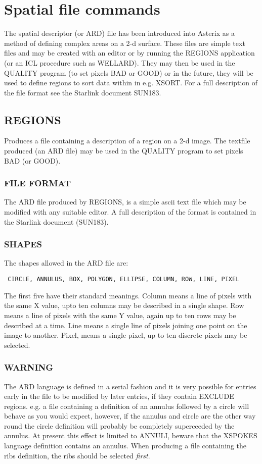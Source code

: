 \documentclass{book}
\renewcommand{\_}{{\tt\char'137}}     %
\begin{document}
\chapter{Spatial file commands}
The spatial descriptor (or ARD) file has been introduced into Asterix
as a method of defining complex areas on a 2-d surface. These files
are simple text files and may be created with an editor or by running
the REGIONS application (or an ICL procedure such as WELLARD). They
may then be used in the QUALITY program (to set pixels BAD or GOOD) or
in the future, they will be used to define regions to sort data within
in e.g. XSORT. For a full description of the file format see the Starlink
document SUN183.
 
\section{REGIONS}
Produces a file containing a description of a region on a 2-d image.
The textfile produced (an ARD file) may be used in the QUALITY program
to set pixels BAD (or GOOD).
 
\subsection{FILE FORMAT}
The ARD file produced by REGIONS, is a simple ascii text file which
may be modified with any suitable editor. A full description of the
format is contained in the Starlink document (SUN183).
 
\subsection{SHAPES}
The shapes allowed in the ARD file are:
 
\begin{verbatim}
 CIRCLE, ANNULUS, BOX, POLYGON, ELLIPSE, COLUMN, ROW, LINE, PIXEL
\end{verbatim}
The first five have their standard meanings. Column means a line of pixels
with the same X value, upto ten columns may be described in a single
shape. Row means a line of pixels with the same Y value, again up to
ten rows may be described at a time. Line means a single line of pixels
joining one point on the image to another. Pixel, means a single pixel,
up to ten discrete pixels may be selected.
 
\subsection{WARNING}
The ARD language is defined in a serial fashion and it is very possible
for entries early in the file to be modified by later entries, if they
contain EXCLUDE regions. e.g. a file containing a definition of an
annulus followed by a circle will behave as you would expect, however, if the
annulus and circle are the other way round the circle definition will
probably be completely superceeded by the annulus. At present this
effect is limited to ANNULI, beware that the XSPOKES language definition
contains an annulus. When producing a file containing the ribs definition,
the ribs should be selected {\em first}.
 
\end{document}
